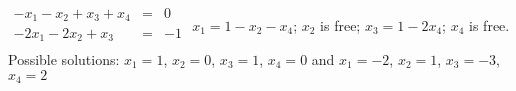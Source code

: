 {$\begin{array}{rcr}
-x_1 - x_2 + x_3 + x_4 &=& 0\\
-2x_1 - 2x_2 + x_3 &=& -1\\
\end{array}$}
{$x_1=1-x_2-x_4$; $x_2$ is free; $x_3=1-2x_4$; $x_4$ is free. Possible solutions: $x_1 = 1$, $x_2 = 0$, $x_3 = 1$, $x_4 = 0$ and $x_1 = -2$, $x_2 = 1$, $x_3 = -3$, $x_4=2$ }
